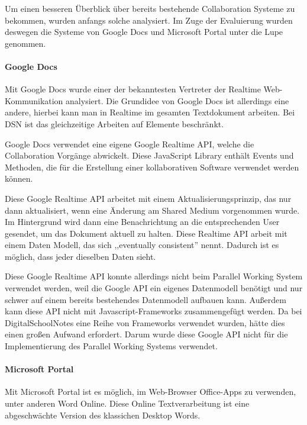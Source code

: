 
Um einen besseren Überblick über bereits bestehende Collaboration Systeme zu bekommen, wurden anfangs solche analysiert. Im Zuge der Evaluierung wurden deswegen die Systeme von Google Docs und Microsoft Portal unter die Lupe genommen.
\paragraph{Google Docs}
Mit Google Docs wurde einer der bekanntesten Vertreter der Realtime Web-\\Kommunikation analysiert. Die Grundidee von Google Docs ist allerdings eine andere, hierbei kann man in Realtime im gesamten Textdokument arbeiten. Bei DSN ist das gleichzeitige Arbeiten auf Elemente beschränkt.

Google Docs verwendet eine eigene Google Realtime API, welche die Collaboration Vorgänge abwickelt. Diese JavaScript Library enthält Events und Methoden, die für die Erstellung einer kollaborativen Software verwendet werden können.

Diese Google Realtime API arbeitet mit einem Aktualisierungsprinzip, das nur dann aktualisiert, wenn eine Änderung am Shared Medium vorgenommen wurde. Im Hintergrund wird dann eine Benachrichtung an die entsprechenden User gesendet, um das Dokument aktuell zu halten. Diese Realtime API arbeit mit einem Daten Modell, das sich ,,eventually consistent'' nennt. Dadurch ist es möglich, dass jeder dieselben Daten sieht.\cite{GOOGLE}

Diese Google Realtime API konnte allerdings nicht beim Parallel Working System verwendet werden, weil die Google API ein eigenes Datenmodell benötigt und nur schwer auf einem bereits bestehendes Datenmodell aufbauen kann. Außerdem kann diese API nicht mit Javascript-Frameworks zusammengefügt werden. Da bei DigitalSchoolNotes eine Reihe von Frameworks verwendet wurden, hätte dies einen großen Aufwand erfordert. Darum wurde diese Google API nicht für die Implementierung des Parallel Working Systems verwendet.

\newpage

\paragraph{Microsoft Portal}
Mit Microsoft Portal ist es möglich, im Web-Browser Office-Apps zu verwenden, unter anderen Word Online. Diese Online Textverarbeitung ist eine abgeschwächte Version des klassichen Desktop Words.

